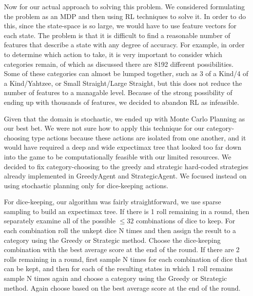 \documentclass{article}
\begin{document}
Now for our actual approach to solving this problem.
We considered formulating the problem as an MDP and
then using RL techniques to solve it. In order to do this, since the state-space
is so large, we would have to use feature vectors for each state. The problem is
that it is difficult to find a reasonable number of features that describe a
state with any degree of accuracy. For example, in order to determine which
action to take, it is very important to consider which categories remain, of
which as discussed there are 8192 different possibilities. Some of these
categories can almost be lumped together, such as 3 of a Kind/4 of a 
Kind/Yahtzee,
or Small Straight/Large Straight, but this does not reduce the number of
features to a managable level. Because of the strong possibility of ending up
with thousands of features, we decided to abandon RL as infeasible.

\vspace{1em}

Given that the domain is stochastic, we ended up with Monte Carlo Planning as
our best bet. We were not sure how to apply this technique for our
category-choosing type actions because these actions are isolated from one
another, and it would have required a deep and wide expectimax tree that looked too far down into the game to be computationally feasible with our limited
resources. We decided to fix category-choosing to the greedy and strategic
hard-coded strategies already implemented in GreedyAgent and StrategicAgent. We
focused instead on using stochastic planning only for dice-keeping actions.

\vspace{1em}

For dice-keeping, our algorithm was fairly straightforward, we use sparse
sampling to build an expectimax tree. If there is 1 roll 
remaining in a round, then separately examine all of the possible $\le 32$
combinations of dice to keep. For each combination roll the unkept dice N times
and then assign the result to a category using the Greedy or Strategic method.
Choose the dice-keeping combination with the best average score at the end of
the round.
If there are 2 rolls remaining in a round, first sample N times
for each combination of dice that can be kept, and then for each of the
resulting states in which 1 roll remains sample N times again and choose a
category using the Greedy or Strategic method. Again choose based on the best
average score at the end of the round.

\vspace{1em}
\end{document}
